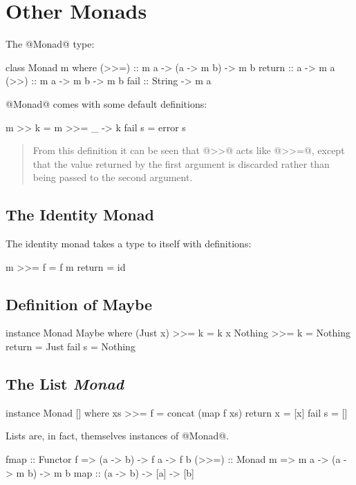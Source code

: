 \chapter{Other Monads}

The @Monad@ type\cite[p.~402]{thompson99}:

\begin{code}
class Monad m where
  (>>=)  :: m a -> (a -> m b) -> m b
  return :: a -> m a
  (>>)   :: m a -> m b -> m b
  fail   :: String -> m a
\end{code}

@Monad@ comes with some default definitions:

\begin{code}
  m >> k = m >>= \_ -> k
  fail s = error s
\end{code}

\begin{quote}
From this definition it can be seen that @>>@ acts like @>>=@, except that the
value returned by the first argument is discarded rather than being passed to
the second argument. \cite[p.~403]{thompson99}
\end{quote}

\section{The Identity Monad \cite[p.~404]{thompson99}}

The identity monad takes a type to itself with definitions:

\begin{code}
  m >>= f = f m
  return  = id
\end{code}

\section{Definition of Maybe}

\begin{code}
instance Monad Maybe where
  (Just x) >>= k  = k x
  Nothing >>= k   = Nothing
  return          = Just
  fail s          = Nothing
\end{code}

\section{The List \textit{Monad}}

\begin{code}
instance Monad [] where
  xs >>= f = concat (map f xs)
  return x = [x]
  fail s = []
\end{code}

Lists are, in fact, themselves instances of @Monad@.

\begin{code}
fmap  :: Functor f => (a -> b) -> f a -> f b
(>>=) :: Monad   m => m a -> (a -> m b) -> m b
map   :: (a -> b) -> [a] -> [b]
\end{code}
